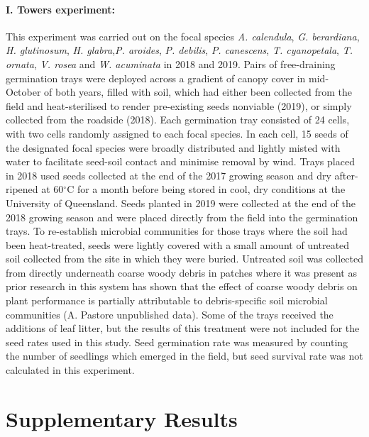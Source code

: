 \documentclass[a4,12pt]{article}
\begin{document}
        \paragraph{I. Towers experiment: }
        This experiment was carried out on the focal species \textit{A. calendula}, \textit{G. berardiana}, \textit{H. glutinosum}, \textit{H. glabra},\textit{P. aroides}, \textit{P. debilis}, \textit{P. canescens}, \textit{T. cyanopetala}, \textit{T. ornata}, \textit{V. rosea} and \textit{W. acuminata} in 2018 and 2019. Pairs of free-draining germination trays were deployed across a gradient of canopy cover in mid-October of both years, filled with soil, which had either been collected from the field and heat-sterilised to render pre-existing seeds nonviable (2019), or simply collected from the roadside (2018). Each germination tray consisted of 24 cells, with two cells randomly assigned to each focal species. In each cell, 15 seeds of the designated focal species were broadly distributed and lightly misted with water to facilitate seed-soil contact and minimise removal by wind. Trays placed in 2018 used seeds collected at the end of the 2017 growing season and dry after-ripened at 60$^{\circ}$C for a month before being stored in cool, dry conditions at the University of Queensland. Seeds planted in 2019 were collected at the end of the 2018 growing season and were placed directly from the field into the germination trays. To re-establish microbial communities for those trays where the soil had been heat-treated, seeds were lightly covered with a small amount of untreated soil collected from the site in which they were buried. Untreated soil was collected from directly underneath coarse woody debris in patches where it was present as prior research in this system has shown that the effect of coarse woody debris on plant performance is partially attributable to debris-specific soil microbial communities (A. Pastore unpublished data). Some of the trays received the additions of leaf litter, but the results of this treatment were not included for the seed rates used in this study. Seed germination rate was measured by counting the number of seedlings which emerged in the field, but seed survival rate was not calculated in this experiment.






\section{Supplementary Results}
\label{SI:results}
\end{document}

